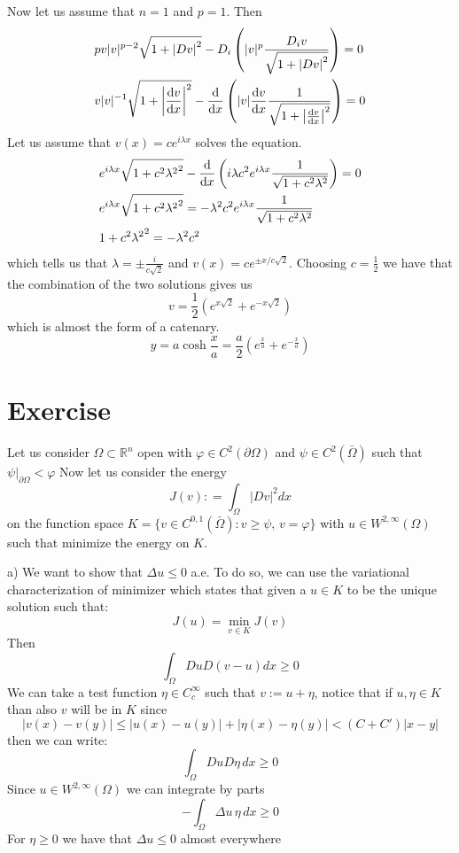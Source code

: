 \documentclass{article}
\newcommand{\R}{\mathbb{R}}
\begin{document}
Now let us assume that $n = 1$ and $p = 1$. Then
\[
    \begin{split}
        & p v|v|^{p-2} \sqrt{1+ {|Dv|}^2}-D_i \left( |v|^p \frac{D_i v}{\sqrt{1+ {|Dv|}^2}} \right) = 0\\
        & v|v|^{-1} \sqrt{1+ {\left|\odv{v}{x}\right|}^2}- \odv{}{x} \left( |v| \odv{v}{x} \frac{1}{\sqrt{1+ {\left|\odv{v}{x} \right|}^2}} \right) = 0\\
    \end{split}
\]
Let us assume that $v(x) = c e^{i\lambda x}$ solves the equation.
\[
    \begin{split}
        & e^{i\lambda x} \sqrt{1+ {c^2 \lambda^2}^2}- \odv{}{x} \left( i \lambda c^2 e^{i\lambda x} \frac{1}{\sqrt{1+ c^2 \lambda^2}} \right) = 0\\
        & e^{i\lambda x} \sqrt{1+ {c^2 \lambda^2}^2} =  - \lambda^2 c^2 e^{i\lambda x} \frac{1}{\sqrt{1+ c^2 \lambda^2}} \\
        & 1+ {c^2 \lambda^2}^2 =  - \lambda^2 c^2\\
    \end{split}
\]
which tells us that $\lambda = \pm \frac{i}{c\sqrt{2}}$ and $v(x) = c e^{\pm x/c\sqrt{2}}$. Choosing $c = \frac{1}{2}$ we have that the combination of the two solutions gives us
\[
    v = \frac{1}{2} (e^{x \sqrt{2}} + e^{-x \sqrt{2}})
\]
which is almost the form of a catenary.
\[
    y = a \cosh{\frac{x}{a}} = \frac{a}{2} (e^{\frac{x}{a}} + e^{-\frac{x}{a}})
\]
\section{Exercise}
Let us consider $\Omega \subset \R^n$ open with $\varphi \in C^2(\partial \Omega)$ and $\psi \in C^2(\bar \Omega)$ such that $\psi|_{\partial \Omega} < \varphi$ Now let us consider the energy
\[
    J(v) : = \int_\Omega |Dv|^2 dx
\]
on the function space $K = \{ v \in C^{0,1}(\bar \Omega): v\geq \psi,\, v = \varphi \}$ with $u \in W^{2,\infty} (\Omega)$ such that minimize the energy on $K$.

a) We want to show that $\Delta u \leq 0$ a.e. To do so, we can use the variational characterization of minimizer which states that given a $u \in K$ to be the unique solution such that:
\[
    J(u) = \min_{v \in K} J(v)
\]
Then
\[
    \int_\Omega Du D(v-u)dx \geq 0
\]
We can take a test function $\eta \in C^\infty_c$ such that $v:= u + \eta$, notice that if $u, \eta \in K$ than also $v$ will be in $K$ since 
\[
    |v(x) - v(y)| \leq |u(x) - u(y)| + |\eta(x) - \eta(y)| < (C+C') |x-y|
\]
then we can write:
\[
    \int_\Omega Du D\eta\, dx \geq 0
\]
Since $u \in W^{2,\infty} (\Omega)$  we can integrate by parts 
\[
    - \int_\Omega \Delta u\, \eta\, dx \geq 0
\]
For $ \eta \geq 0$ we have that $\Delta u \leq 0$ almost everywhere
\end{document}
